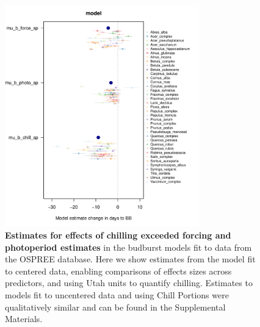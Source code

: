 \documentclass{article}
\begin{document}
\begin{figure}[h!]
\centering
\noindent \includegraphics[width=0.75\textwidth]{..//..//analyses/bb_analysis/figures/muplotmodelspcompexprampfputah_z.pdf}
\caption{\textbf{Estimates for effects of chilling exceeded forcing and photoperiod estimates} in the budburst models fit to data from the OSPREE database. Here we show estimates from the model fit to centered data, enabling comparisons of effects sizes across predictors, and using Utah units to quantify chilling. Estimates to models fit to uncentered data and using Chill Portions were qualitatively similar and can be found in the Supplemental Materials.} 
\label{fig:mu}
\end{figure}
\end{document}
